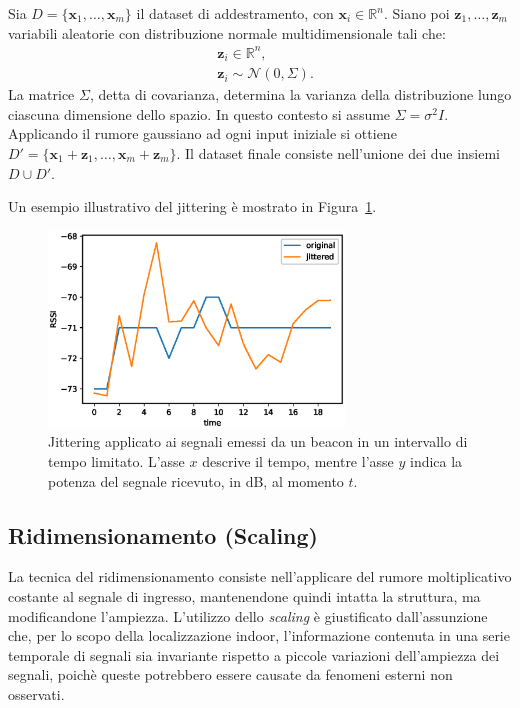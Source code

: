 Sia \(D = \{\bm x_1, \dotsc, \bm x_m\}\) il dataset di addestramento, con 
\(\bm x_i \in \mathbb{R}^n \). Siano poi \(\bm z_1,
  \dotsc, \bm z_m \) variabili aleatorie con distribuzione normale
multidimensionale tali che: 
\begin{align*}
& \bm z_i \in \mathbb{R}^n, \\ 
& \bm z_i \sim \mathcal{N}(0, \Sigma).
\end{align*}
La matrice \(\Sigma\), detta di covarianza, determina la varianza della
distribuzione lungo ciascuna dimensione dello spazio. In questo contesto si
assume \(\Sigma=\sigma^2I\). Applicando il rumore gaussiano ad ogni input
iniziale si ottiene \(D' = \{\bm x_1 + \bm z_1, \dotsc, \bm x_m + \bm z_m\}\).
Il dataset finale consiste nell'unione dei due insiemi \( D \cup D'\).

Un esempio illustrativo del jittering è mostrato in Figura~\ref{fig:jitter}.
\begin{figure}[!htp]
  \centering\includegraphics[width=0.7\textwidth]{./img/jittering.eps}
  \caption{Jittering applicato ai segnali emessi da un beacon in un intervallo
    di tempo limitato. L'asse \(x\) descrive il tempo, mentre l'asse \(y\)
    indica la potenza del segnale ricevuto, in dB, al momento \(t\).}%
  \label{fig:jitter}%
\end{figure}

\subsection{Ridimensionamento (Scaling)}
La tecnica del ridimensionamento consiste nell'applicare del rumore
moltiplicativo costante al segnale di ingresso, mantenendone quindi intatta la
struttura, ma modificandone l'ampiezza. L'utilizzo dello \emph{scaling} è
giustificato dall'assunzione che, per lo scopo della localizzazione indoor,
l'informazione contenuta in una serie temporale di segnali sia invariante
rispetto a piccole variazioni dell'ampiezza dei segnali, poichè queste
potrebbero essere causate da fenomeni esterni non osservati.

